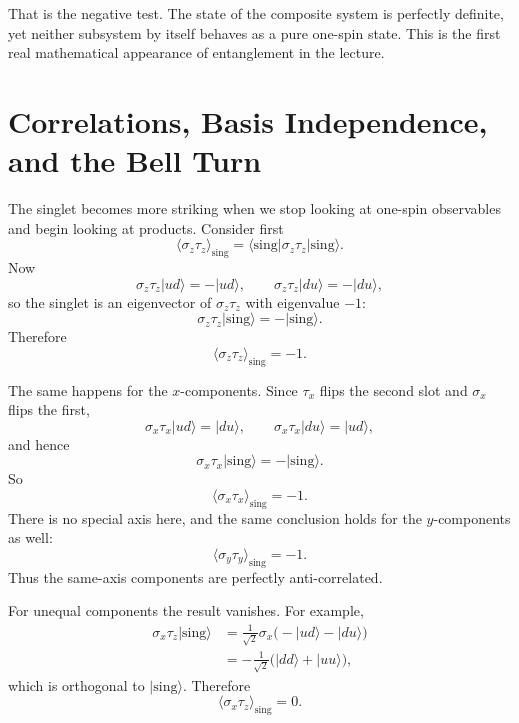 That is the negative test. The state of the composite system is perfectly definite, yet neither subsystem by itself behaves as a pure one-spin state. This is the first real mathematical appearance of entanglement in the lecture.

\section{Correlations, Basis Independence, and the Bell Turn}

The singlet becomes more striking when we stop looking at one-spin observables and begin looking at products. Consider first
\begin{equation}
\langle \sigma_z\tau_z\rangle_{\mathrm{sing}}
=
\langle \mathrm{sing}|\sigma_z\tau_z|\mathrm{sing}\rangle.
\end{equation}
Now
\begin{equation}
\sigma_z\tau_z|ud\rangle=-|ud\rangle,
\qquad
\sigma_z\tau_z|du\rangle=-|du\rangle,
\end{equation}
so the singlet is an eigenvector of \(\sigma_z\tau_z\) with eigenvalue \(-1\):
\begin{equation}
\sigma_z\tau_z|\mathrm{sing}\rangle=-|\mathrm{sing}\rangle.
\end{equation}
Therefore
\begin{equation}
\langle \sigma_z\tau_z\rangle_{\mathrm{sing}}=-1.
\end{equation}

The same happens for the \(x\)-components. Since \(\tau_x\) flips the second slot and \(\sigma_x\) flips the first,
\begin{equation}
\sigma_x\tau_x|ud\rangle=|du\rangle,
\qquad
\sigma_x\tau_x|du\rangle=|ud\rangle,
\end{equation}
and hence
\begin{equation}
\sigma_x\tau_x|\mathrm{sing}\rangle=-|\mathrm{sing}\rangle.
\end{equation}
So
\begin{equation}
\langle \sigma_x\tau_x\rangle_{\mathrm{sing}}=-1.
\end{equation}
There is no special axis here, and the same conclusion holds for the \(y\)-components as well:
\begin{equation}
\langle \sigma_y\tau_y\rangle_{\mathrm{sing}}=-1.
\end{equation}
Thus the same-axis components are perfectly anti-correlated.

For unequal components the result vanishes. For example,
\begin{align}
\sigma_x\tau_z|\mathrm{sing}\rangle
&=
\frac{1}{\sqrt2}\sigma_x\bigl(-|ud\rangle-|du\rangle\bigr)
\nonumber\\
&=
-\frac{1}{\sqrt2}\bigl(|dd\rangle+|uu\rangle\bigr),
\end{align}
which is orthogonal to \(|\mathrm{sing}\rangle\). Therefore
\begin{equation}
\langle \sigma_x\tau_z\rangle_{\mathrm{sing}}=0.
\end{equation}

